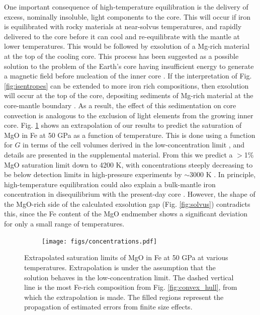 One important consequence of high-temperature equilibration is the delivery of excess,
nominally insoluble, light components to the core. This will occur if iron is
equilibrated with rocky materials at near-solvus temperatures, and rapidly delivered to
the core before it can cool and re-equilibrate with the mantle at lower temperatures.
This would be followed by exsolution of a Mg-rich material at the top of the cooling
core. This process has been suggested as a possible solution to the problem of the
Earth's core having  insufficient energy to generate a magnetic field before nucleation
of the inner core \citep{Stevenson2012}. If the interpretation of Fig.
\ref{fig:isentropes} can be extended to more iron rich compositions, then exsolution will
occur at the top of the core, depositing sediments of Mg-rich material at the core-mantle
boundary \citep{buffett2000}. As a result, the effect of this sedimentation on core
convection is analogous to the exclusion of light elements from the growing inner core.
Fig. \ref{fig:concentrations} shows an extrapolation of our results to predict the
saturation of MgO in Fe at 50 GPa as a function of temperature.  This is done using a
function for $G$ in terms of the cell volumes derived in the low-concentration limit
\citep{Wilson2012a,Wahl2013}, and details are presented in the supplemental material. From
this we predict a $>$1\% MgO saturation limit down to 4200 K, with concentrations steeply
decreasing to be below detection limits in high-pressure experiments by $\sim$3000 K
\citep{Knittle1991,Ozawa2008a}. In principle, high-temperature equilibration could also
explain a bulk-mantle iron concentration in disequilibrium with the present-day core
\citep{Ozawa2008a,Tsuno2013}. However, the shape of the MgO-rich side of the calculated
exsolution gap (Fig. \ref{fig:solvus}) contradicts this, since the Fe content of the MgO
endmember shows a significant deviation for only a small range of temperatures.

\begin{figure}[h!]  
  \centering
    \texttt{[image: figs/concentrations.pdf]}  
\caption{Extrapolated saturation limits of MgO in Fe at 50 GPa at various temperatures.
  Extrapolation is under the assumption that the solution behaves in the
  low-concentration limit. The dashed vertical line is the most Fe-rich composition from
  Fig. \ref{fig:convex_hull}, from which the extrapolation is made. The filled regions
  represent the propagation of estimated errors from finite size effects.}
\label{fig:concentrations}
\end{figure}


